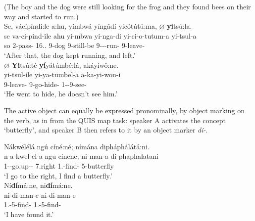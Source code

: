 \documentclass[output=paper]{langscibook}
\begin{document}
\ea
\label{bkm:Ref124154447}
(The boy and the dog were still looking for the frog and they found bees on their way and started to run.)\\
Se, vácípíndí:le a:hu, yímbwá yíngâdí yicótútú:ma, ${\varnothing}$ \textbf{yi}tsú:la. \\
\gll
se  va-ci-pind-ile  ahu  yi-mbwa  yi-nga-di  yi-ci-o-tutum-a  yi-tsul-a\\
so  2\SM{}-pass-\PFV{}  16.\DEM{}.\MED{}   9-dog  9\SM{}-still-be  9\SM{}-\CON{}-\PROG{}-run-\FV{}  9\SM{}-leave-\FV{} \\
\glt
‘After that, the dog kept running, and left.’\\

\sn
${\varnothing}$ \textbf{Yi}tsú:té \textbf{yí}yátúmbé:lá, akáyíwô:ne.\\
\gll
yi-tsul-ile  yi-ya-tumbel-a  a-ka-yi-won-i\\
9\SM{}-leave-\PFV{}  9\SM{}-go-hide-\FV{}  1\SM{}-\NEG{}-9\OM{}-see-\NEG{}\\
\glt
‘He went to hide, he doesn’t see him.’\\

\z

The active object can equally be expressed pronominally, by object marking on the verb, as in  from the QUIS map task: speaker A activates the concept ‘butterfly’, and speaker B then refers to it by an object marker \textit{di\nobreakdash-}.

\ea
\begin{xlist}
\label{bkm:Ref124152314}
Nákwélélá ngú cíné:né; nímána dipháphálátá:ni.\\
\gll
n-a-kwel-el-a  ngu  cinene;  ni-man-a  di-phaphalatani\\
1\SM{}-\PRS{}-go.up-\APPL{}-\FV{}  \PREP{}  7.right   1\SG.\SM-{}find-\FV{}  5-butterfly\\
\glt
‘I go to the right, I find a butterfly.’\\

Ní\textbf{dí}má:ne, ni\textbf{dí}má:ne.\\
\gll
ni-di-man-e  ni-di-man-e\\
1\SG.\SM{}-5\OM{}-find-\PFV{}  1\SG.\SM{}-5\OM{}-find-\PFV{}\\
\glt
‘I have found it.’

\end{xlist}
\z
\end{document}
